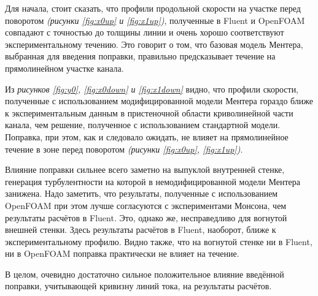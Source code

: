 Для начала, стоит сказать, что профили продольной скорости на участке перед поворотом \textit{(рисунки \ref{fig:x0up} и \ref{fig:x1up})}, полученные в Fluent и OpenFOAM совпадают с точностью до толщины линии и очень хорошо соответствуют экспериментальному течению. Это говорит о том, что базовая модель Ментера, выбранная для введения поправки, правильно предсказывает течение на прямолинейном участке канала.

Из \textit{рисунков \ref{fig:y0}, \ref{fig:x0down} и \ref{fig:x1down}} видно, что профили скорости, полученные с использованием модифицированной модели Ментера гораздо ближе к экспериментальным данным в пристеночной области криволинейной части канала, чем решение, полученное с использованием стандартной модели. Поправка, при этом, как и следовало ожидать, не влияет на прямолинейное течение в зоне перед поворотом \textit{(рисунки \ref{fig:x0up}, \ref{fig:x1up})}.

Влияние поправки сильнее всего заметно на выпуклой внутренней стенке, генерация турбулентности на которой в немодифицированной модели Ментера занижена. Надо заметить, что результаты, полученные с использованием OpenFOAM при этом лучше согласуются с экспериментами Монсона, чем результаты расчётов в Fluent. Это, однако же, несправедливо для вогнутой внешней стенки. Здесь результаты расчётов в Fluent, наоборот, ближе к экспериментальному профилю. Видно также, что на вогнутой стенке ни в Fluent, ни в OpenFOAM поправка практически не влияет на течение.

В целом, очевидно достаточно сильное положительное влияние введённой поправки, учитывающей кривизну линий тока, на результаты расчётов.